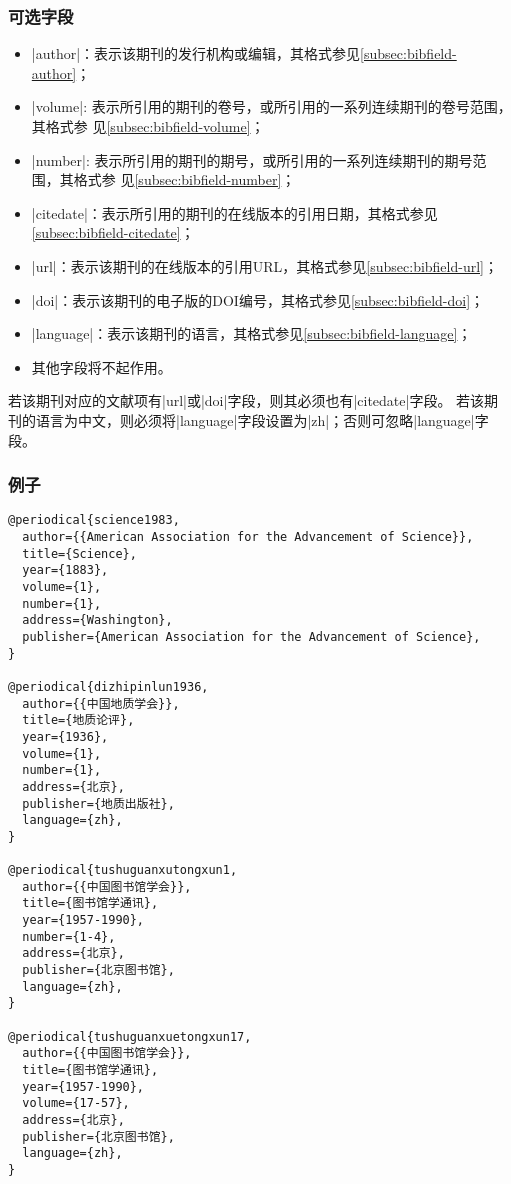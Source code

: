 \subsubsection{可选字段}

\begin{itemize}
\item |author|：表示该期刊的发行机构或编辑，其格式参见\ref{subsec:bibfield-author}；
\item |volume|: 表示所引用的期刊的卷号，或所引用的一系列连续期刊的卷号范围，其格式参
  见\ref{subsec:bibfield-volume}；
\item |number|: 表示所引用的期刊的期号，或所引用的一系列连续期刊的期号范围，其格式参
  见\ref{subsec:bibfield-number}；
\item |citedate|：表示所引用的期刊的在线版本的引用日期，其格式参见\ref{subsec:bibfield-citedate}；
\item |url|：表示该期刊的在线版本的引用URL，其格式参见\ref{subsec:bibfield-url}；
\item |doi|：表示该期刊的电子版的DOI编号，其格式参见\ref{subsec:bibfield-doi}；
\item |language|：表示该期刊的语言，其格式参见\ref{subsec:bibfield-language}；
\item 其他字段将不起作用。
\end{itemize}


\begin{note}
若该期刊对应的文献项有|url|或|doi|字段，则其必须也有|citedate|字段。
若该期刊的语言为中文，则必须将|language|字段设置为|zh|；否则可忽略|language|字段。
\end{note}

\subsubsection{例子}

\begin{verbatim}
@periodical{science1983,
  author={{American Association for the Advancement of Science}},
  title={Science},
  year={1883},
  volume={1},
  number={1},
  address={Washington},
  publisher={American Association for the Advancement of Science},
}

@periodical{dizhipinlun1936,
  author={{中国地质学会}},
  title={地质论评},
  year={1936},
  volume={1},
  number={1},
  address={北京},
  publisher={地质出版社},
  language={zh},
}

@periodical{tushuguanxutongxun1,
  author={{中国图书馆学会}},
  title={图书馆学通讯},
  year={1957-1990},
  number={1-4},
  address={北京},
  publisher={北京图书馆},
  language={zh},
}

@periodical{tushuguanxuetongxun17,
  author={{中国图书馆学会}},
  title={图书馆学通讯},
  year={1957-1990},
  volume={17-57},
  address={北京},
  publisher={北京图书馆},
  language={zh},
}
\end{verbatim}


